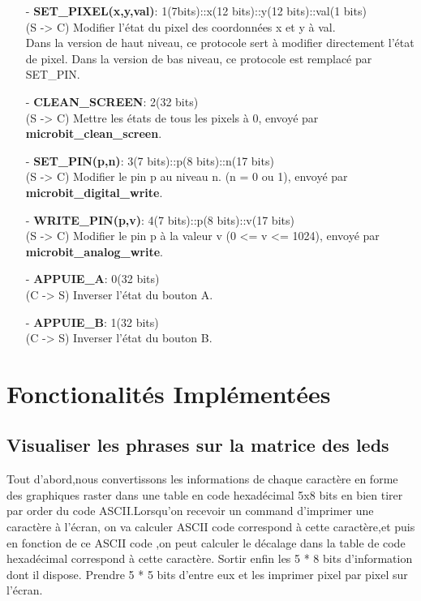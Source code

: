 \documentclass[14px]{article}
\begin{document}
\begin{enumerate}
\item[-] \textbf{SET\_PIXEL(x,y,val)}: 1(7bits)::x(12 bits)::y(12 bits)::val(1 bits)\\
(S -> C) Modifier l'état du pixel des coordonnées x et y à val.\\
Dans la version de haut niveau, ce protocole sert à modifier directement l'état de pixel. Dans la version de bas niveau, ce protocole est remplacé par SET\_PIN.

\item[-] \textbf{CLEAN\_SCREEN}: 2(32 bits)\\
(S -> C) Mettre les états de tous les pixels à 0, envoyé par \textbf{microbit\_clean\_screen}.

\item[-] \textbf{SET\_PIN(p,n)}: 3(7 bits)::p(8 bits)::n(17 bits)\\
(S -> C) Modifier le pin p au niveau n. (n = 0 ou 1), envoyé par \textbf{microbit\_digital\_write}.

\item[-] \textbf{WRITE\_PIN(p,v)}: 4(7 bits)::p(8 bits)::v(17 bits)\\
(S -> C) Modifier le pin p à la valeur v (0 <= v <= 1024), envoyé par \textbf{microbit\_analog\_write}.

\item[-] \textbf{APPUIE\_A}: 0(32 bits)\\
(C -> S) Inverser l'état du bouton A.

\item[-] \textbf{APPUIE\_B}: 1(32 bits)\\
(C -> S) Inverser l'état du bouton B.
\end{enumerate}

\clearpage

\section{Fonctionalités Implémentées}
\subsection{Visualiser les phrases sur la matrice des leds}
Tout d'abord,nous convertissons les informations de chaque caractère en forme des graphiques raster dans une table en code hexadécimal 5x8 bits en bien tirer par order du code ASCII.Lorsqu'on recevoir un command d'imprimer une caractère à l'écran,
on va calculer ASCII code correspond à cette caractère,et puis en fonction de ce ASCII code ,on peut calculer le décalage dans la table de code hexadécimal correspond à cette caractère. Sortir enfin les 5 * 8 bits d'information dont il dispose. Prendre 5 * 5 bits d'entre eux et les imprimer pixel par pixel sur l'écran.\\
\end{document}
